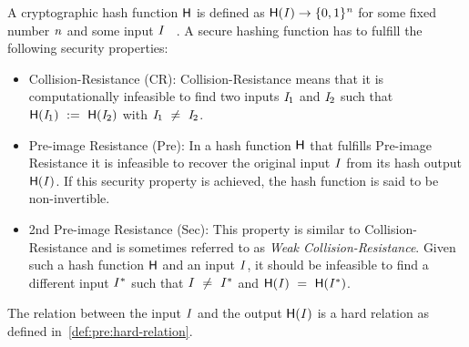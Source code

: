 \begin{definition}\label{def:pre:hash-function}
    A cryptographic hash function $\mathsf{H}$ is defined as $\mathsf{H} (\mathit{I}) \rightarrow \{0,1\}^{\mathit{n}}$ for some fixed number $\mathit{n}$ and some input $\mathit{I}$ ~\cite{al2011cryptographic}.
    A secure hashing function has to fulfill the following security properties:
    \begin{itemize}
        \item Collision-Resistance (CR): Collision-Resistance means that it is computationally infeasible to find two inputs $\mathit{I}_1$ and $\mathit{I}_2$ such that
        $\mathsf{H} (\mathit{I}_1) ~:=~ \mathsf{H} (\mathit{I}_2)$ with $\mathit{I}_1 ~\neq~ \mathit{I}_2$.
        \item Pre-image Resistance (Pre): In a hash function $\mathsf{H}$ that fulfills Pre-image Resistance it is infeasible to recover the original input $\mathit{I}$ from its hash output $\mathsf{H} (\mathit{I})$.
        If this security property is achieved, the hash function is said to be non-invertible.
        \item 2nd Pre-image Resistance (Sec):  This property is similar to Collision-Resistance and is sometimes referred to as \textit{Weak Collision-Resistance}.
        Given such a hash function $\mathsf{H}$ and an input $\mathit{I}$, it should be infeasible to find a different input $\mathit{I}^*$ such that $\mathit{I} ~\neq~ \mathit{I}^*$
        and $\mathsf{H} (\mathit{I}) ~=~ \mathsf{H} (\mathit{I}^*)$.
    \end{itemize}
    The relation between the input $\mathit{I}$ and the output $\mathsf{H} (\mathit{I})$ is a hard relation as defined in~\cref{def:pre:hard-relation}.
\end{definition}

